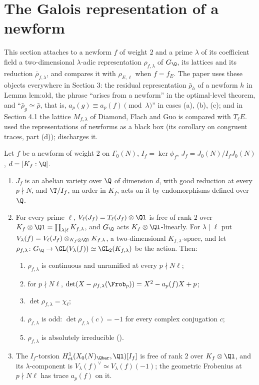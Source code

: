 \section{The Galois representation of a newform}\label{sec:modgalrep:galrep}

This section attaches to a newform $f$ of weight $2$ and a prime $\lambda$ of its coefficient field a two-dimensional $\lambda$-adic representation
$\rho_{f,\lambda}$ of $G_\Q$, its lattices and its reduction $\bar\rho_{f,\lambda}$, and compares it with $\rho_{E,\ell}$ when $f=f_E$. The paper uses these objects
everywhere in Section 3: the residual representation $\bar\rho_h$ of a newform $h$ in Lemma lem:old, the phrase ``arises from a newform'' in the
optimal-level theorem, and ``$\bar\rho_g\simeq\bar\rho$, that is, $a_p(g)\equiv a_p(f)\pmod\lambda$'' in cases (a), (b), (c); and in Section 4.1 the lattice
$M_{f,\lambda}$ of Diamond, Flach and Guo is compared with $T_\ell E$.  used the representations of newforms as a black box
(its corollary on congruent traces, part (d));  discharges it.

\begin{theorem}\label{thm:modgalrep:eichler-shimura}
Let $f$ be a newform of weight $2$ on $\Gamma_0(N)$, $I_f=\ker\phi_f$, $J_f=J_0(N)/I_fJ_0(N)$, $d=[K_f:\Q]$.
\begin{enumerate}[label=(\roman*)]
\item $J_f$ is an abelian variety over $\Q$ of dimension $d$, with good reduction at every $p\nmid N$, and $\T/I_f$, an order in $K_f$, acts on it by
endomorphisms defined over $\Q$.
\item For every prime $\ell$, $V_\ell(J_f)=T_\ell(J_f)\otimes\Ql$ is free of rank $2$ over $K_f\otimes\Ql=\prod_{\lambda\mid\ell}K_{f,\lambda}$, and $G_\Q$ acts $K_f\otimes\Ql$-linearly. For
$\lambda\mid\ell$ put $V_\lambda(f)=V_\ell(J_f)\otimes_{K_f\otimes\Ql}K_{f,\lambda}$, a two-dimensional $K_{f,\lambda}$-space, and let $\rho_{f,\lambda}\colon G_\Q\to\GL(V_\lambda(f))\simeq\GL_2(K_{f,\lambda})$ be the
action. Then:
\begin{enumerate}[label=(\alph*)]
\item $\rho_{f,\lambda}$ is continuous and unramified at every $p\nmid N\ell$;
\item for $p\nmid N\ell$, $\det(X-\rho_{f,\lambda}(\Frob_p))=X^2-a_p(f)X+p$;
\item $\det\rho_{f,\lambda}=\chi_\ell$;
\item $\rho_{f,\lambda}$ is odd: $\det\rho_{f,\lambda}(c)=-1$ for every complex conjugation $c$;
\item $\rho_{f,\lambda}$ is absolutely irreducible ().
\end{enumerate}
\item The $I_f$-torsion $H^1_{\mathrm{et}}(X_0(N)_{\Qbar},\Ql)[I_f]$ is free of rank $2$ over $K_f\otimes\Ql$, and its $\lambda$-component is $V_\lambda(f)^\vee\simeq V_\lambda(f)(-1)$; the
geometric Frobenius at $p\nmid N\ell$ has trace $a_p(f)$ on it.
\end{enumerate}
\end{theorem}

